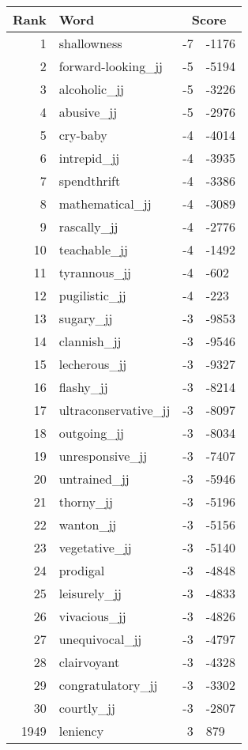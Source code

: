 \begin{longtable}[!htbp]{| rlr@{.}l |}
    \hline
    \textbf{Rank} & \textbf{Word} & \multicolumn{2}{c|}{\textbf{Score}} \\
    \hline
    \endhead
    1 & shallowness & -7 & -1176 \\
    2 & forward-looking\_jj & -5 & -5194 \\
    3 & alcoholic\_jj & -5 & -3226 \\
    4 & abusive\_jj & -5 & -2976 \\
    5 & cry-baby & -4 & -4014 \\
    6 & intrepid\_jj & -4 & -3935 \\
    7 & spendthrift & -4 & -3386 \\
    8 & mathematical\_jj & -4 & -3089 \\
    9 & rascally\_jj & -4 & -2776 \\
    10 & teachable\_jj & -4 & -1492 \\
    11 & tyrannous\_jj & -4 & -602 \\
    12 & pugilistic\_jj & -4 & -223 \\
    13 & sugary\_jj & -3 & -9853 \\
    14 & clannish\_jj & -3 & -9546 \\
    15 & lecherous\_jj & -3 & -9327 \\
    16 & flashy\_jj & -3 & -8214 \\
    17 & ultraconservative\_jj & -3 & -8097 \\
    18 & outgoing\_jj & -3 & -8034 \\
    19 & unresponsive\_jj & -3 & -7407 \\
    20 & untrained\_jj & -3 & -5946 \\
    21 & thorny\_jj & -3 & -5196 \\
    22 & wanton\_jj & -3 & -5156 \\
    23 & vegetative\_jj & -3 & -5140 \\
    24 & prodigal & -3 & -4848 \\
    25 & leisurely\_jj & -3 & -4833 \\
    26 & vivacious\_jj & -3 & -4826 \\
    27 & unequivocal\_jj & -3 & -4797 \\
    28 & clairvoyant & -3 & -4328 \\
    29 & congratulatory\_jj & -3 & -3302 \\
    30 & courtly\_jj & -3 & -2807 \\
    1949 & leniency & 3 & 879 \\

\end{longtable}

